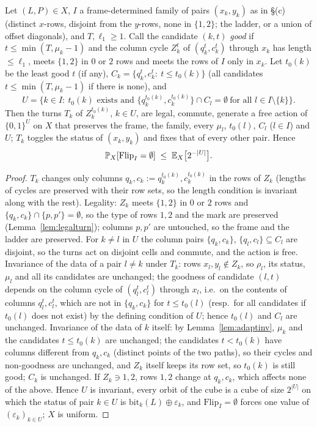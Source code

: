\begin{proposition}\label{prop:adaptive}
Let $(L,P)\in X$, $I$ a frame-determined family of pairs $(x_k,y_k)$
as in \S(c) (distinct $x$-rows, disjoint from the $y$-rows, none in
$\{1,2\}$; the ladder, or a union of offset diagonals), and
$T,\ell_1\ge1$.  Call the candidate $(k,t)$ \emph{good} if
$t\le\min(T,\mu_k-1)$ and the column cycle $Z_k^t$ of $(q_k^t,c_k^t)$
through $x_k$ has length $\le\ell_1$, meets $\{1,2\}$ in $0$ or $2$
rows and meets the rows of $I$ only in $x_k$.  Let $t_0(k)$ be
the least good $t$ (if any), $C_k=\{q_k^t,c_k^t:\ t\le t_0(k)\}$
(all candidates $t\le\min(T,\mu_k-1)$ if there is none), and
\[
U=\bigl\{k\in I:\ t_0(k)\text{ exists and }\{q_k^{t_0(k)},c_k^{t_0(k)}\}\cap C_l=\emptyset\ \text{for all }l\in I\setminus\{k\}\bigr\}.
\]
Then the turns $T_k$ of $Z_k^{t_0(k)}$, $k\in U$, are legal, commute,
generate a free action of $\{0,1\}^U$ on $X$ that preserves the frame,
the family, every $\mu_l$, $t_0(l)$, $C_l$ ($l\in I$) and $U$; $T_k$
toggles the status of $(x_k,y_k)$ and fixes that of every other pair.
Hence
\[
\mathbb{P}_X[\mathrm{Flip}_I=\emptyset]\;\le\;\mathbb{E}_X\bigl[2^{-|U|}\bigr].
\]
\end{proposition}
\begin{proof}
$T_k$ changes only columns $q_k,c_k:=q_k^{t_0(k)},c_k^{t_0(k)}$ in the
rows of $Z_k$ (lengths of cycles are preserved with their row sets, so
the length condition is invariant along with the rest).  Legality: $Z_k$ meets $\{1,2\}$ in $0$ or $2$ rows and
$\{q_k,c_k\}\cap\{p,p'\}=\emptyset$, so the type of rows $1,2$ and the
mark are preserved (Lemma~\ref{lem:legalturn}); columns $p,p'$ are
untouched, so the frame and the ladder are preserved.  For $k\ne l$ in
$U$ the column pairs $\{q_k,c_k\}$, $\{q_l,c_l\}\subseteq C_l$ are
disjoint, so the turns act on disjoint cells and commute, and the
action is free.  Invariance of the data of a pair $l\ne k$ under $T_k$:
rows $x_l,y_l\notin Z_k$, so $\rho_l$, its status, $\mu_l$ and all its
candidates are unchanged; the goodness of candidate $(l,t)$ depends on
the column cycle of $(q_l^t,c_l^t)$ through $x_l$, i.e.\ on the
contents of columns $q_l^t,c_l^t$, which are not in $\{q_k,c_k\}$ for
$t\le t_0(l)$ (resp.\ for all candidates if $t_0(l)$ does not exist) by
the defining condition of $U$; hence $t_0(l)$ and $C_l$ are unchanged.
Invariance of the data of $k$ itself: by Lemma~\ref{lem:adaptinv},
$\mu_k$ and the candidates $t\le t_0(k)$ are unchanged; the candidates
$t<t_0(k)$ have columns different from $q_k,c_k$ (distinct points of
the two paths), so their cycles and non-goodness are unchanged, and
$Z_k$ itself keeps its row set, so $t_0(k)$ is still good; $C_k$ is
unchanged.  If $Z_k\ni1,2$, rows $1,2$ change at $q_k,c_k$, which
affects none of the above.  Hence $U$ is invariant, every orbit of the
cube is a cube of size $2^{|U|}$ on which the status of pair $k\in U$
is $\mathrm{bit}_k(L)\oplus\varepsilon_k$, and $\mathrm{Flip}_I=\emptyset$
forces one value of $(\varepsilon_k)_{k\in U}$; $X$ is uniform.
\end{proof}

